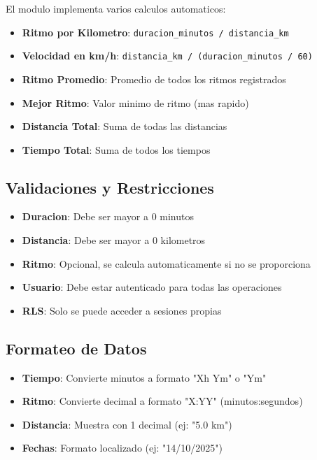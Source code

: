 \documentclass[12pt,a4paper]{article}
\begin{document}
El modulo implementa varios calculos automaticos:

\begin{itemize}
    \item \textbf{Ritmo por Kilometro}: \texttt{duracion\_minutos / distancia\_km}
    \item \textbf{Velocidad en km/h}: \texttt{distancia\_km / (duracion\_minutos / 60)}
    \item \textbf{Ritmo Promedio}: Promedio de todos los ritmos registrados
    \item \textbf{Mejor Ritmo}: Valor minimo de ritmo (mas rapido)
    \item \textbf{Distancia Total}: Suma de todas las distancias
    \item \textbf{Tiempo Total}: Suma de todos los tiempos
\end{itemize}

\subsection{Validaciones y Restricciones}

\begin{itemize}
    \item \textbf{Duracion}: Debe ser mayor a 0 minutos
    \item \textbf{Distancia}: Debe ser mayor a 0 kilometros
    \item \textbf{Ritmo}: Opcional, se calcula automaticamente si no se proporciona
    \item \textbf{Usuario}: Debe estar autenticado para todas las operaciones
    \item \textbf{RLS}: Solo se puede acceder a sesiones propias
\end{itemize}

\subsection{Formateo de Datos}

\begin{itemize}
    \item \textbf{Tiempo}: Convierte minutos a formato "Xh Ym" o "Ym"
    \item \textbf{Ritmo}: Convierte decimal a formato "X:YY" (minutos:segundos)
    \item \textbf{Distancia}: Muestra con 1 decimal (ej: "5.0 km")
    \item \textbf{Fechas}: Formato localizado (ej: "14/10/2025")
\end{itemize}
\end{document}
